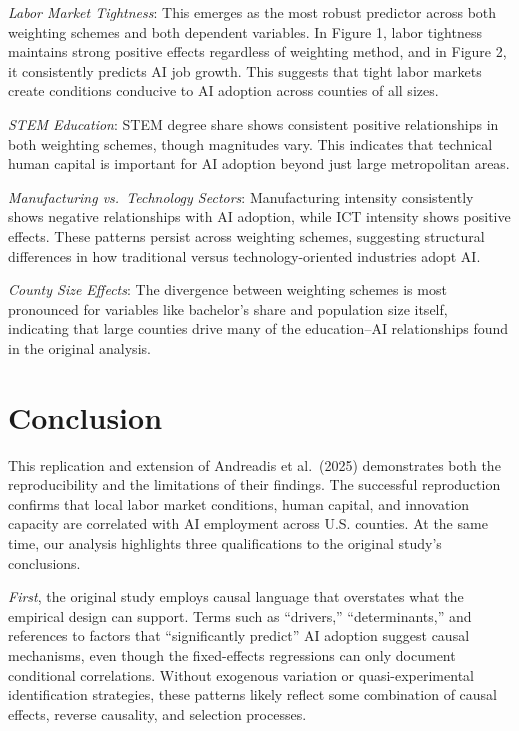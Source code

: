 \documentclass[
]{article}
\begin{document}
\emph{Labor Market Tightness}: This emerges as the most robust predictor
across both weighting schemes and both dependent variables. In Figure 1,
labor tightness maintains strong positive effects regardless of
weighting method, and in Figure 2, it consistently predicts AI job
growth. This suggests that tight labor markets create conditions
conducive to AI adoption across counties of all sizes.

\emph{STEM Education}: STEM degree share shows consistent positive
relationships in both weighting schemes, though magnitudes vary. This
indicates that technical human capital is important for AI adoption
beyond just large metropolitan areas.

\emph{Manufacturing vs.~Technology Sectors}: Manufacturing intensity
consistently shows negative relationships with AI adoption, while ICT
intensity shows positive effects. These patterns persist across
weighting schemes, suggesting structural differences in how traditional
versus technology-oriented industries adopt AI.

\emph{County Size Effects}: The divergence between weighting schemes is
most pronounced for variables like bachelor's share and population size
itself, indicating that large counties drive many of the education--AI
relationships found in the original analysis.

\section{Conclusion}\label{conclusion}

This replication and extension of Andreadis et al.~(2025) demonstrates
both the reproducibility and the limitations of their findings. The
successful reproduction confirms that local labor market conditions,
human capital, and innovation capacity are correlated with AI employment
across U.S. counties. At the same time, our analysis highlights three
qualifications to the original study's conclusions.

\emph{First}, the original study employs causal language that overstates
what the empirical design can support. Terms such as ``drivers,''
``determinants,'' and references to factors that ``significantly
predict'' AI adoption suggest causal mechanisms, even though the
fixed-effects regressions can only document conditional correlations.
Without exogenous variation or quasi-experimental identification
strategies, these patterns likely reflect some combination of causal
effects, reverse causality, and selection processes.
\end{document}
